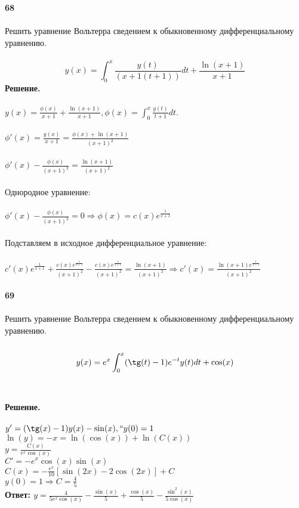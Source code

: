 \documentclass[10pt,a4paper]{article}
\begin{document}
	\noindent\textbf{68} \\ \\
	Решить уравнение Вольтерра сведением к обыкновенному дифференциальному уравнению.\\ \\
	$$y(x) = \int_{0}^{x}\frac{y(t)}{(x+1(t+1))}dt + \frac{\ln(x+1)}{x+1}$$ 
	\textbf{Решение.} \\ \\
	$y(x) = \frac{\phi(x)}{x+1} + \frac{\ln(x+1)}{x+1}, \phi(x) = \int_{0}^{x}\frac{y(t)}{t+1}dt.$ \\  \\
	$\phi'(x) = \frac{y(x)}{x+1} = \frac{\phi(x) + \ln(x+1)}{(x+1)^2}$ \\ \\
	$\phi'(x) - \frac{\phi(x)}{(x+1)^2} = \frac{\ln(x+1)}{(x+1)^2}$ \\ \\ 
	Однородное уравнение: \\ \\
	$\phi'(x) - \frac{\phi(x)}{(x+1)^2} = 0 \Rightarrow \phi(x) = c(x)e^{\frac{1}{x+1}}$ \\ \\ 
	Подставляем в исходное дифференциальное уравнение: \\ \\
	$c'(x)e^{\frac{1}{x+1}} + \frac{c(x)e^{\frac{1}{x+1}}}{(x+1)^2} - \frac{c(x)e^{\frac{1}{x+1}}}{(x+1)^2} = \frac{\ln(x+1)}{(x+1)^2} \Rightarrow c'(x) = \frac{\ln(x+1)e^{\frac{1}{x+1}}}{(x+1)^2}$ \\ \\

	\noindent\textbf{69} \\ \\
	Решить уравнение Вольтерра сведением к обыкновенному дифференциальному уравнению.\\ \\
	$$y(x)=e^x\int_0^x(\tg(t)-1)e^{-t}y(t)dt+\cos(x)$$ \\ \\ 
	\textbf{Решение.} \\ \\
	$y'=(\tg(x)-1)y(x)-\sin(x),``y(0)=1$\\
	$\ln(y)=-x=\ln(\cos(x))+\ln(C(x))$\\
	$y=\frac{C(x)}{e^x\cos(x)}$\\
	$C'=-e^x\cos(x)\sin(x)$\\
	$C(x)=-\frac{e^x}{10}[\sin(2x)-2\cos(2x)]+C$\\
	$y(0)=1 \Rightarrow C=\frac{4}{5}$\\
	\textbf{Ответ: $y=\frac{4}{5e^x\cos(x)}-\frac{\sin(x)}{5}+\frac{\cos(x)}{5}-\frac{\sin^2(x)}{5\cos(x)}$} \\ \\
\end{document}
